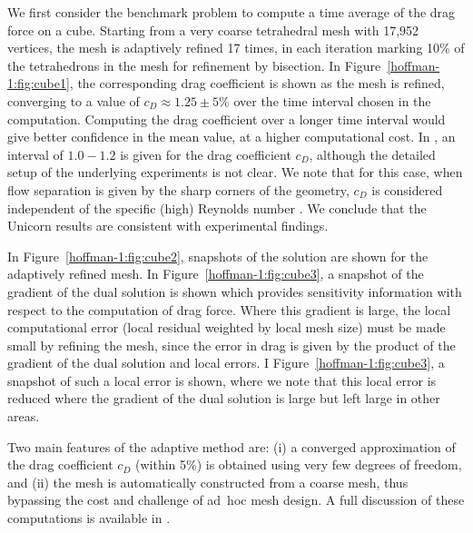 We first consider the benchmark problem to compute a time average of
the drag force on a cube. Starting from a very coarse tetrahedral mesh
with 17,952 vertices, the mesh is adaptively refined 17 times, in each
iteration marking 10\% of the tetrahedrons in the mesh for refinement
by bisection. In Figure~\ref{hoffman-1:fig:cube1}, the corresponding drag
coefficient is shown as the mesh is refined, converging to a value of
$c_D\approx 1.25\pm 5\%$ over the time interval chosen in the
computation. Computing the drag coefficient over a longer time
interval would give better confidence in the mean value, at a higher
computational cost. In \citet{Mccormick1995}, an interval of $1.0-1.2$
is given for the drag coefficient $c_D$, although the detailed setup
of the underlying experiments is not clear. We note that for this
case, when flow separation is given by the sharp corners of the
geometry, $c_D$ is considered independent of the specific (high)
Reynolds number \citep{Mccormick1995}. We conclude that the Unicorn
results are consistent with experimental findings.

In Figure~\ref{hoffman-1:fig:cube2}, snapshots of the solution are shown for the
adaptively refined mesh. In Figure~\ref{hoffman-1:fig:cube3}, a snapshot of the
gradient of the dual solution is shown which provides sensitivity
information with respect to the computation of drag force. Where this
gradient is large, the local computational error (local residual
weighted by local mesh size) must be made small by refining the mesh,
since the error in drag is given by the product of the gradient of the
dual solution and local errors. I Figure~\ref{hoffman-1:fig:cube3}, a snapshot
of such a local error is shown, where we note that this local error is
reduced where the gradient of the dual solution is large but left
large in other areas.

Two main features of the adaptive method are: (i) a converged
approximation of the drag coefficient $c_D$ (within 5\%) is obtained
using very few degrees of freedom, and (ii) the mesh is automatically
constructed from a coarse mesh, thus bypassing the cost and challenge
of ad~hoc mesh design. A full discussion of these computations is
available in \citet{HoffmanJansson2011}.

